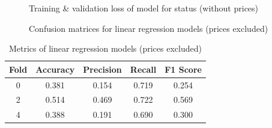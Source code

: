 \documentclass[12pt,twoside]{report}
\begin{document}
\begin{figure}[!htbp]
	\hfil
	\caption{Training \& validation loss of model for status (without prices)}
	\label{linear_regression_status_exclude_full}
\end{figure}

\begin{figure}[!htbp]
	\centering
	\hfill
	\hfill
	\caption{Confusion matrices for linear regression models (prices excluded)}
	\label{cm_excluded}
\end{figure}

\begin{table}[!htbp]
	\centering
	\caption{Metrics of linear regression models (prices excluded)}
	\label{metrics_linear_regression_status_excluded}
	\begin{tabular}{| c | c | c | c | c |}
		\hline
		Fold & Accuracy & Precision & Recall & F1 Score \\
		\hline
		0 & 0.381 & 0.154 & 0.719 & 0.254 \\
		\hline
		2 & 0.514 & 0.469 & 0.722 & 0.569 \\
		\hline
		4 & 0.388 & 0.191 & 0.690 & 0.300 \\
		\hline
	\end{tabular}
\end{table}
\end{document}
